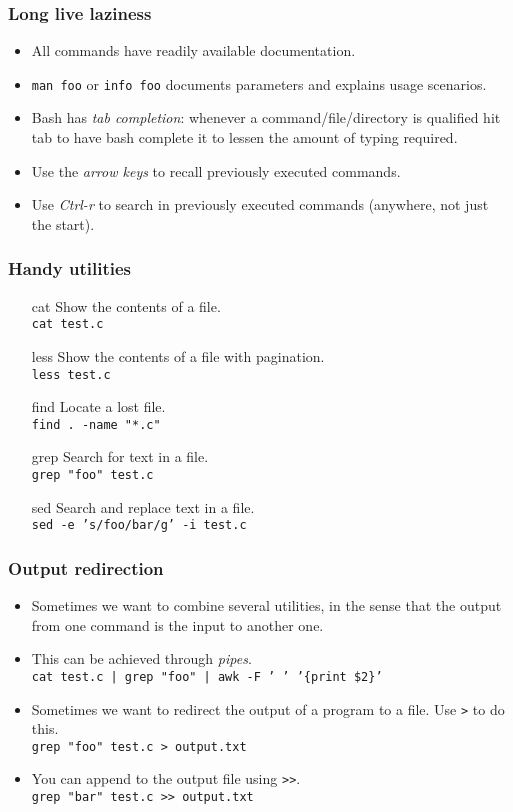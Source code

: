 \begin{frame}
  \frametitle{Long live laziness}

  \begin{itemize}
  \item All commands have readily available documentation.
  \item \texttt{man foo} or \texttt{info foo} documents parameters and explains
    usage scenarios.
  \item Bash has \emph{tab completion}: whenever a command/file/directory is
    qualified hit tab to have bash complete it to lessen the amount of typing
    required.
  \item Use the \emph{arrow keys} to recall previously executed commands.
  \item Use \emph{Ctrl-r} to search in previously executed commands (anywhere,
    not just the start).
  \end{itemize}
\end{frame}

\begin{frame}
  \frametitle{Handy utilities}
  \begin{itemize}
    \setlength{\itemindent}{1cm}
  \item[cat] Show the contents of a file. \\ \texttt{cat test.c}
  \item[less] Show the contents of a file with pagination. \\ \texttt{less test.c}
  \item[find] Locate a lost file. \\ \texttt{find .~-name "*.c"}
  \item[grep] Search for text in a file. \\ \texttt{grep "foo" test.c}
  \item[sed] Search and replace text in a file. \\ \texttt{sed -e 's/foo/bar/g' -i test.c}
  \end{itemize}
\end{frame}

\begin{frame}
  \frametitle{Output redirection}
  \begin{itemize}
  \item Sometimes we want to combine several utilities, in the sense that the output from
    one command is the input to another one.
  \item This can be achieved through \emph{pipes}. \\
    \texttt{cat test.c | grep "foo" | awk -F ' ' '\{print\ \$2\}'}
  \item Sometimes we want to redirect the output of a program to a file. Use
    \texttt{>} to do this. \\
    \texttt{grep "foo" test.c > output.txt}
  \item You can append to the output file using \texttt{>\hspace{0pt}>}. \\
    \texttt{grep "bar" test.c >\hspace{0pt}> output.txt}
  \end{itemize}
\end{frame}

